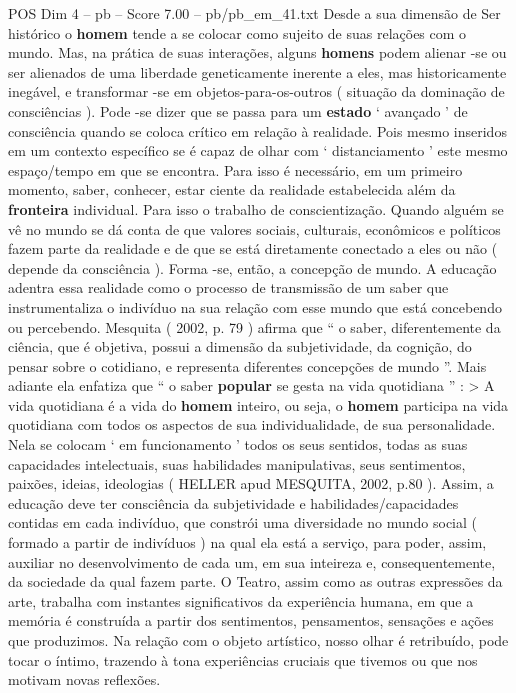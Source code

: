 \begin{textsample}{POS Dim 4 – pb – Score 7.00 – pb/pb\_em\_41.txt}
Desde a sua dimensão de Ser histórico o \textbf{homem} tende a se colocar como sujeito de suas relações com o mundo.
Mas, na prática de suas interações, alguns \textbf{homens} podem alienar -se ou ser alienados de uma liberdade geneticamente inerente a eles, mas historicamente inegável, e transformar -se em objetos-para-os-outros ( situação da dominação de consciências ).
Pode -se dizer que se passa para um \textbf{estado} ‘ avançado ’ de consciência quando se coloca crítico em relação à realidade.
Pois mesmo inseridos em um contexto específico se é capaz de olhar com ‘ distanciamento ’ este mesmo espaço/tempo em que se encontra.
Para isso é necessário, em um primeiro momento, saber, conhecer, estar ciente da realidade estabelecida além da \textbf{fronteira} individual.
Para isso o trabalho de conscientização.
Quando alguém se vê no mundo se dá conta de que valores sociais, culturais, econômicos e políticos fazem parte da realidade e de que se está diretamente conectado a eles ou não ( depende da consciência ).
Forma -se, então, a concepção de mundo.
A educação adentra essa realidade como o processo de transmissão de um saber que instrumentaliza o indivíduo na sua relação com esse mundo que está concebendo ou percebendo.
Mesquita ( 2002, p. 79 ) afirma que “ o saber, diferentemente da ciência, que é objetiva, possui a dimensão da subjetividade, da cognição, do pensar sobre o cotidiano, e representa diferentes concepções de mundo ”.
Mais adiante ela enfatiza que “ o saber \textbf{popular} se gesta na vida quotidiana ” : > A vida quotidiana é a vida do \textbf{homem} inteiro, ou seja, o \textbf{homem} participa na vida quotidiana com todos os aspectos de sua individualidade, de sua personalidade.
Nela se colocam ‘ em funcionamento ’ todos os seus sentidos, todas as suas capacidades intelectuais, suas habilidades manipulativas, seus sentimentos, paixões, ideias, ideologias ( HELLER apud MESQUITA, 2002, p.80 ).
Assim, a educação deve ter consciência da subjetividade e habilidades/capacidades contidas em cada indivíduo, que constrói uma diversidade no mundo social ( formado a partir de indivíduos ) na qual ela está a serviço, para poder, assim, auxiliar no desenvolvimento de cada um, em sua inteireza e, consequentemente, da sociedade da qual fazem parte.
O Teatro, assim como as outras expressões da arte, trabalha com instantes significativos da experiência humana, em que a memória é construída a partir dos sentimentos, pensamentos, sensações e ações que produzimos.
Na relação com o objeto artístico, nosso olhar é retribuído, pode tocar o íntimo, trazendo à tona experiências cruciais que tivemos ou que nos motivam novas reflexões.

\end{textsample}
